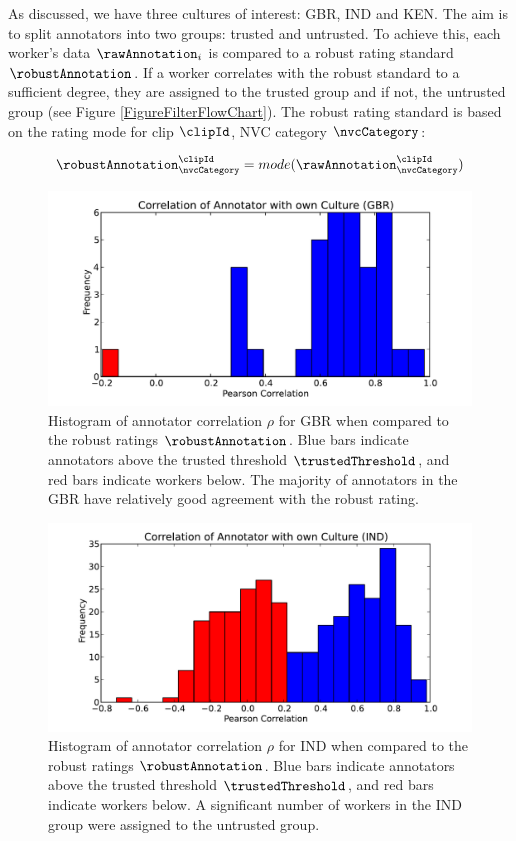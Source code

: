 As discussed, we have three cultures of interest: GBR, IND and KEN. The aim is to split annotators into two groups: trusted and untrusted. To achieve this, each worker's data $\rawAnnotation_i$ is compared to a robust rating standard $\robustAnnotation$. If a worker correlates with the robust standard to a sufficient degree, they are assigned to the trusted group and if not, the untrusted group (see Figure \ref{FigureFilterFlowChart}). The robust rating standard is based on the rating mode for clip $\clipId$, \ac{NVC} category $\nvcCategory$:

\begin{gather}
\robustAnnotation^{\clipId}_{\nvcCategory} = mode(\rawAnnotation^{\clipId}_{\nvcCategory})
\end{gather}

\begin{figure}
\centering
\includegraphics[width = 0.6 \columnwidth]{annotation/correlgbr.pdf}
\caption{Histogram of annotator correlation $\rho$ for GBR when compared to the robust ratings $\robustAnnotation$. Blue bars indicate annotators above the trusted threshold $\trustedThreshold$, and red bars indicate workers below. The majority of annotators in the GBR have relatively good agreement with the robust rating.}
\label{FigureCorrelationHistOfGbr}
\end{figure}

\begin{figure}
\centering
\includegraphics[width = 0.6 \columnwidth]{annotation/correlind.pdf}
\caption{Histogram of annotator correlation $\rho$ for IND when compared to the robust ratings $\robustAnnotation$. Blue bars indicate annotators above the trusted threshold $\trustedThreshold$, and red bars indicate workers below. A significant number of workers in the IND group were assigned to the untrusted group.}
\label{FigureCorrelationHistOfInd}
\end{figure}


